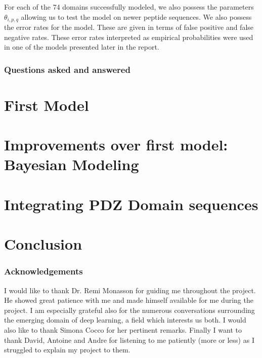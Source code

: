 \documentclass[a4paper, 12pt]{article}
\begin{document}
	For each of the 74 domains successfully modeled, we also possess the parameters $\theta_{i,p,q}$ allowing us to test the model on newer peptide sequences. We also possess the error rates for the model. These are given in terms of false positive and false negative rates. These error rates interpreted as empirical probabilities were used in one of the models presented later in the report.

	\section{Questions asked and answered}

\part{First Model}
\part{Improvements over first model: Bayesian Modeling}
\part{Integrating PDZ Domain sequences} 
\part{Conclusion}

\section*{Acknowledgements}
I would like to thank Dr. Remi Monasson for guiding me throughout the project. He showed great patience with me and made himself available for me during the project. I am especially grateful also for the numerous conversations surrounding the emerging domain of deep learning, a field which interests us both. I would also like to thank Simona Cocco for her pertinent remarks. Finally I want to thank David, Antoine and Andre for listening to me patiently (more or less) as I struggled to explain my project to them. 
\end{document}

